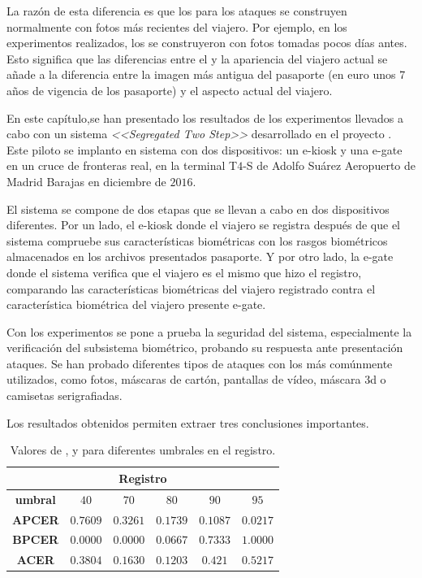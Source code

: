 La razón de esta diferencia es que los  para los ataques se construyen normalmente con fotos más recientes  del viajero. Por ejemplo, en los experimentos realizados, los  se construyeron con fotos tomadas pocos días antes. Esto significa que las diferencias entre el  y la apariencia del viajero actual se añade a la diferencia entre la imagen más antigua del pasaporte (en euro unos 7 años de vigencia de los pasaporte) y el aspecto actual del viajero.


En este capítulo,se han presentado los resultados de los experimentos llevados a cabo con un sistema  \textit{<<Segregated Two Step>>} desarrollado en el proyecto . Este piloto se implanto en sistema  con dos dispositivos: un \gls{e-kiosk} y una \gls{e-gate} en un cruce de fronteras real, en la terminal T$4$-S de Adolfo Suárez Aeropuerto de Madrid Barajas en diciembre de $2016$.

El sistema se compone de dos etapas que se llevan a cabo en dos dispositivos diferentes. Por un lado, el \gls{e-kiosk} donde el viajero se registra después de que el sistema compruebe sus características biométricas con los rasgos biométricos almacenados en los archivos presentados pasaporte. Y por otro lado, la \gls{e-gate} donde el sistema verifica que el viajero es el mismo que hizo el registro, comparando las características biométricas del viajero registrado contra el característica biométrica del viajero presente \gls{e-gate}. 

Con los experimentos se pone a prueba la seguridad del sistema, especialmente la verificación del subsistema biométrico, probando su respuesta ante presentación ataques. Se han probado diferentes tipos de ataques con los  más comúnmente utilizados, como fotos, máscaras de cartón, pantallas de vídeo, máscara $3$d o camisetas serigrafiadas.

Los resultados obtenidos permiten extraer tres conclusiones importantes.

\begin{table}
\centering
\begin{tabular}{|c|c|c|c|c|c|}
\hline
\multicolumn{6}{|c|}{\textbf{Registro}}  \\ \hline
\textbf{umbral}  & $40$ & $70$ & $80$ & $90$ & $95$ \\ \hline
\textbf{APCER} & $0.7609$ & $0.3261$ & $0.1739$ & $0.1087$ & $0.0217$ \\ \hline
\textbf{BPCER} & $0.0000$ & $0.0000$ & $0.0667$ & $0.7333$ & $1.0000$ \\ \hline
\textbf{ACER} & $0.3804$ & $0.1630$ & $0.1203$ & $0.421$ & $0.5217$ \\ \hline
\end{tabular}
\caption{Valores de ,  y  para diferentes umbrales en el registro.}
\label{tab:resultadosEnRegistro}
\end{table}

